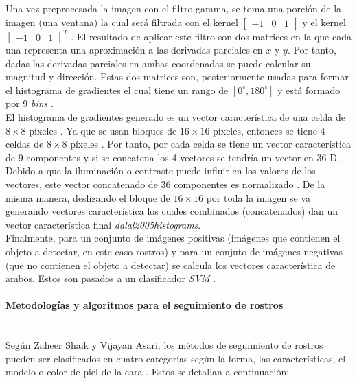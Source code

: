 \documentclass[a4paper,openright,12pt]{report}
\begin{document}
Una vez preprocesada la imagen con el filtro gamma, se toma una porción de la
imagen (una ventana) la cual será filtrada con el kernel
$[\begin{matrix}-1 & 0 & 1\end{matrix}]$ y el kernel
$[\begin{matrix}-1 & 0 & 1\end{matrix}]^T$ \cite{dalal2005histograms}.
El resultado de aplicar este filtro son dos matrices en la que cada una
representa una aproximación a las derivadas parciales en $x$ y $y$.
Por tanto, dadas las derivadas parciales en ambas coordenadas se puede calcular
su magnitud y dirección. Estas dos matrices son, posteriormente usadas para
formar el histograma de gradientes el cual tiene un rango de
$[0^\circ, 180^\circ]$ y está formado por 9 \textit{bins}
\cite{dalal2005histograms}.\\

El histograma de gradientes generado es un vector característica de una celda
de $8 \times 8$ píxeles \cite{dalal2005histograms}. Ya que se usan bloques de
$16 \times 16$ píxeles, entonces se tiene 4 celdas de $8 \times 8$ píxeles
\cite{dalal2005histograms}. Por tanto, por cada celda se tiene un vector
característica de 9 componentes y si se concatena los 4 vectores se tendría un
vector en 36-D. Debido a que la iluminación o contraste puede influir 
en los valores de los vectores, este vector concatenado de 36 componentes es
normalizado \cite{dalal2005histograms}. De la misma manera, deslizando el
bloque de $16 \times 16$ por toda la imagen se va generando vectores
característica los cuales combinados (concatenados) dan un vector característica
final \textit{dalal2005histograms}.\\
Finalmente, para un conjunto de imágenes positivas (imágenes que contienen el
objeto a detectar, en este caso rostros) y para un conjuto de imágenes negativas
(que no contienen el objeto a detectar) se calcula los vectores característica
de ambos. Estos son pasados a un clasificador \textit{SVM}
\cite{dalal2005histograms}.

\paragraph{Metodologías y algoritmos para el seguimiento de rostros}\mbox{} \\
Según Zaheer Shaik y Vijayan Asari, los métodos de seguimiento de rostros
pueden ser clasificados en cuatro categorías según la forma, las características,
el modelo o color de piel de la cara \cite{shaik2007robust}. Estos se detallan
a continuación:
\end{document}
